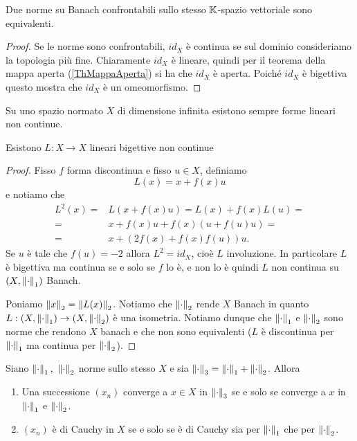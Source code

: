 \begin{proposition}\label{PrNormeConfrontabiliSuBanachSonoEquivalenti}
Due norme su Banach confrontabili sullo stesso $\mathbb{K}$-spazio vettoriale sono equivalenti.
\end{proposition}
\begin{proof}
Se le norme sono confrontabili, $id_X$ \`e continua se sul dominio consideriamo la topologia pi\`u fine. Chiaramente $id_X$ \`e lineare, quindi per il teorema della mappa aperta (\ref{ThMappaAperta}) si ha che $id_X$ \`e aperta. Poich\'e $id_X$ \`e bigettiva questo mostra che $id_X$ \`e un omeomorfismo.
\end{proof}

\begin{exercise}
Su uno spazio normato $X$ di dimensione infinita esistono sempre forme lineari non continue. 
\end{exercise}


\begin{remark}
Esistono $L:X\to X$ lineari bigettive non continue
\end{remark}
\begin{proof}
Fisso $f$ forma discontinua e fisso $u\in X$, definiamo
\[L(x)=x+f(x)u\]
e notiamo che
\begin{align*}
L^2(x)=&L(x+f(x)u)=L(x)+f(x)L(u)=\\
=&x+f(x)u +f(x)(u+f(u)u)=\\
=&x+(2f(x)+f(x)f(u))u.
\end{align*}
Se $u$ \`e tale che $f(u)=-2$ allora $L^2=id_X$, cio\`e $L$ involuzione. In particolare $L$ \`e bigettiva ma continua se e solo se $f$ lo \`e, e non lo \`e quindi $L$ non continua su $(X,\left\Vert{\cdot}\right\Vert_1)$ Banach.

Poniamo $\left\Vert{x}\right\Vert_2=\left\Vert{L(x)}\right\Vert_2$. Notiamo che $\left\Vert{\cdot}\right\Vert_2$ rende $X$ Banach in quanto $L:(X,\left\Vert{\cdot}\right\Vert_1)\to (X,\left\Vert{\cdot}\right\Vert_2)$ \`e una isometria. Notiamo dunque che $\left\Vert{\cdot}\right\Vert_1$ e $\left\Vert{\cdot}\right\Vert_2$ sono norme che rendono $X$ banach e che non sono equivalenti ($L$ \`e discontinua per $\left\Vert{\cdot}\right\Vert_1$ ma continua per $\left\Vert{\cdot}\right\Vert_2$).
\end{proof}

\begin{exercise}
Siano $\left\Vert{\cdot}\right\Vert_1,\ \left\Vert{\cdot}\right\Vert_2$ norme sullo stesso $X$ e sia $\left\Vert{\cdot}\right\Vert_3=\left\Vert{\cdot}\right\Vert_1+\left\Vert{\cdot}\right\Vert_2$. Allora
\begin{enumerate}
    \item Una successione $(x_n)$ converge a $x\in X$ in $\left\Vert{\cdot}\right\Vert_3$ se e solo se converge a $x$ in $\left\Vert{\cdot}\right\Vert_1$ e $\left\Vert{\cdot}\right\Vert_2$.
    \item $(x_n)$ \`e di Cauchy in $X$ se e solo se \`e di Cauchy sia per $\left\Vert{\cdot}\right\Vert_1$ che per $\left\Vert{\cdot}\right\Vert_2$.
\end{enumerate}
\end{exercise}

